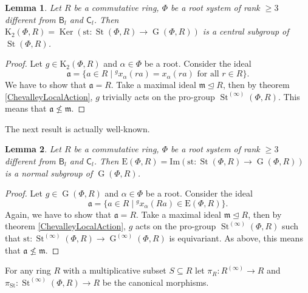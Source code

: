 \documentclass{article}
\numberwithin{equation}{section}
\newtheorem{lemma}{Lemma} \numberwithin{lemma}{section}
\theoremstyle{definition}
\theoremstyle{remark}
\DeclareMathOperator\St{St}
\DeclareMathOperator\Ker{Ker}
\DeclareMathOperator\GG{G}
\newcommand{\up}[2]{{^{#1}\!{#2}}}
\newcommand{\rB}{\mathsf{B}}
\newcommand{\rC}{\mathsf{C}}
\begin{document}
\begin{lemma}\label{CentralityK2}
 Let \(R\) be a commutative ring, \(\Phi\) be a root system of rank \(\geq 3\) different from \(\rB_l\) and \(\rC_l\). Then \(\mathrm K_2(\Phi, R) = \Ker(\mathrm{st} \colon \St(\Phi, R) \to \GG(\Phi, R))\) is a central subgroup of \(\St(\Phi, R)\).
\end{lemma}
\begin{proof}
 Let \(g \in \mathrm K_2(\Phi, R)\) and \(\alpha \in \Phi\) be a root. Consider the ideal
 \[\mathfrak a = \{a \in R \mid \up g{x_\alpha(ra)} = x_\alpha(ra) \text{ for all } r \in R\}.\]
 We have to show that \(\mathfrak a = R\). Take a maximal ideal \(\mathfrak m \trianglelefteq R\), then by theorem \ref{ChevalleyLocalAction}, \(g\) trivially acts on the pro-group \(\St^{(\infty)}(\Phi, R)\). This means that \(\mathfrak a \not \leq \mathfrak m\).
\end{proof}

The next result is actually well-known. %

\begin{lemma}\label{Normality}
 Let \(R\) be a commutative ring, \(\Phi\) be a root system of rank \(\geq 3\) different from \(\rB_l\) and \(\rC_l\). Then \(\mathrm E(\Phi, R) = \mathrm{Im}(\mathrm{st} \colon \St(\Phi, R) \to \GG(\Phi, R))\) is a normal subgroup of \(\GG(\Phi, R)\).
\end{lemma}
\begin{proof}
 Let \(g \in \GG(\Phi, R)\) and \(\alpha \in \Phi\) be a root. Consider the ideal
 \[\mathfrak a = \{a \in R \mid \up g{x_\alpha(Ra)} \in \mathrm E(\Phi, R)\}.\]
 Again, we have to show that \(\mathfrak a = R\). Take a maximal ideal \(\mathfrak m \trianglelefteq R\), then by theorem \ref{ChevalleyLocalAction}, \(g\) acts on the pro-group \(\St^{(\infty)}(\Phi, R)\) such that \(\mathrm{st} \colon \St^{(\infty)}(\Phi, R) \to \GG^{(\infty)}(\Phi, R)\) is equivariant. As above, this means that \(\mathfrak a \not \leq \mathfrak m\).
\end{proof}

For any ring \(R\) with a multiplicative subset \(S \subseteq R\) let \(\pi_R \colon R^{(\infty)} \to R\) and \(\pi_{\St} \colon \St^{(\infty)}(\Phi, R) \to R\) be the canonical morphisms.
\end{document}
